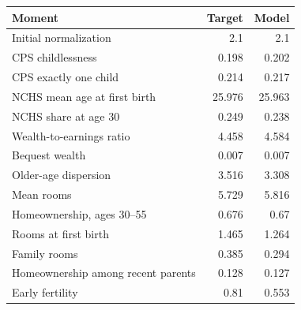 \begin{tabular}{lrr}
\toprule
Moment & Target & Model \\
\midrule
Initial normalization & 2.1 & 2.1 \\
CPS childlessness & 0.198 & 0.202 \\
CPS exactly one child & 0.214 & 0.217 \\
NCHS mean age at first birth & 25.976 & 25.963 \\
NCHS share at age 30 & 0.249 & 0.238 \\
Wealth-to-earnings ratio & 4.458 & 4.584 \\
Bequest wealth & 0.007 & 0.007 \\
Older-age dispersion & 3.516 & 3.308 \\
Mean rooms & 5.729 & 5.816 \\
Homeownership, ages 30--55 & 0.676 & 0.67 \\
Rooms at first birth & 1.465 & 1.264 \\
Family rooms & 0.385 & 0.294 \\
Homeownership among recent parents & 0.128 & 0.127 \\
Early fertility & 0.81 & 0.553 \\
\bottomrule
\end{tabular}
